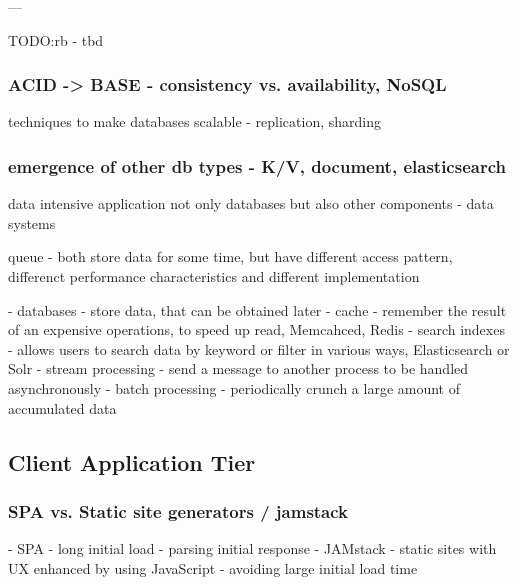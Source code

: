 ---

TODO:rb - tbd


\subsubsection*{ACID -> BASE - consistency vs. availability, NoSQL}

techniques to make databases scalable - replication, sharding

\subsubsection*{emergence of other db types - K/V, document, elasticsearch}


data intensive application
not only databases but also other components - data systems

queue - both store data for some time, but have different access pattern, differenct performance characteristics and different implementation

- databases - store data, that can be obtained later
- cache - remember the result of an expensive operations, to speed up read, Memcahced, Redis
- search indexes - allows users to search data by keyword or filter in various ways, Elasticsearch or Solr
- stream processing - send a message to another process to be handled asynchronously
- batch processing - periodically crunch a large amount of accumulated data

\subsection{Client Application Tier}

\subsubsection*{SPA vs. Static site generators / jamstack}

- SPA - long initial load - parsing initial response
- JAMstack - static sites with UX enhanced by using JavaScript - avoiding large initial load time


